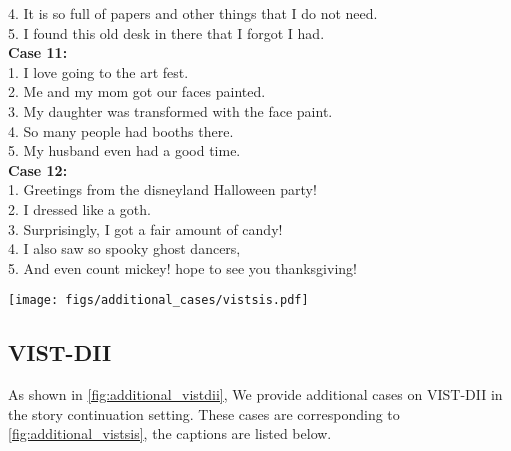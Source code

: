 \documentclass[10pt,twocolumn,letterpaper]{article}
\begin{document}
{{4. It is so full of papers and other things that I do not need.\\
5. I found this old desk in there that I forgot I had.\\
\textbf{Case 11:}\\
1. I love going to the art fest.\\
2. Me and my mom got our faces painted.\\
3. My daughter was transformed with the face paint.\\
4. So many people had booths there.\\
5. My husband even had a good time.\\
\textbf{Case 12:}\\
1. Greetings from the disneyland Halloween party!\\
2. I dressed like a goth.\\
3. Surprisingly, I got a fair amount of candy!\\
4. I also saw so spooky ghost dancers,\\
5. And even count mickey! hope to see you thanksgiving!\\
}}

\begin{figure*}[!th]
\centering
\texttt{[image: figs/additional\_cases/vistsis.pdf]}
\caption{Example of generated visual stories (left 5 frames) from AR-LDM and corresponding ground truths (right 5 frames) on VIST-SIS. These cases are under \textbf{story continuation} setting, which means the first frame serves as a source frame.}
\label{fig:additional_vistsis}
\end{figure*}
\clearpage

\subsection{VIST-DII}

As shown in \cref{fig:additional_vistdii}, We provide additional cases on VIST-DII in the story continuation setting. These cases are corresponding to \cref{fig:additional_vistsis}, the captions are listed below.
\end{document}
